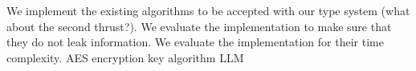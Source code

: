 We implement the existing algorithms to be accepted with our type system (what about the second thrust?). We evaluate the implementation to make sure that they do not leak information. We evaluate the implementation for their time complexity.
AES encryption key algorithm
LLM 


